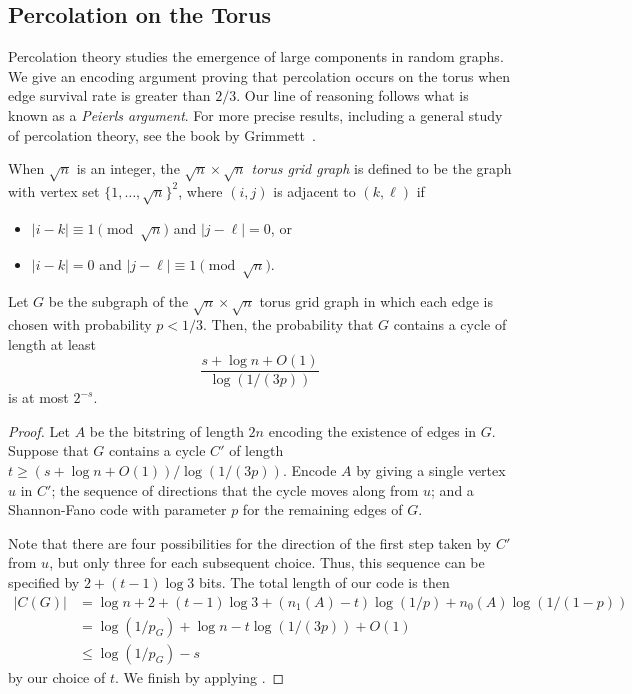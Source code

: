 \documentclass{patmorin}
\begin{document}
\subsection{Percolation on the Torus}

Percolation theory studies the emergence of large components in random
graphs. We give an encoding argument proving that percolation occurs
on the torus when edge survival rate is greater than $2/3$. Our line
of reasoning follows what is known as a \emph{Peierls argument}. For
more precise results, including a general study of percolation theory,
see the book by Grimmett~\cite{grimmett:percolation}.

  When $\sqrt{n}$ is an integer, the \emph{$\sqrt{n} \times \sqrt{n}$
    torus grid graph} is defined to be the graph with vertex set
  $\{1, \ldots, \sqrt{n}\}^2$, where $(i, j)$ is adjacent to
  $(k, \ell)$ if
  \begin{itemize}[topsep=0pt]
    \item $|i - k| \equiv 1 \pmod{\sqrt{n}}$ and $|j - \ell| = 0$, or
    \item $|i - k| = 0$ and $|j - \ell| \equiv 1 \pmod{\sqrt{n}}$.
  \end{itemize}

\begin{thm}
  Let $G$ be the subgraph of the $\sqrt{n} \times \sqrt{n}$ torus grid
  graph in which each edge is chosen with probability $p < 1/3$. Then,
  the probability that $G$ contains a cycle of length at least
  \[\frac{s + \log n + O(1)}{\log (1/(3p))}\]
  is at most $2^{-s}$.
\end{thm}
\begin{proof}
  Let $A$ be the bitstring of length $2n$ encoding the existence of
  edges in $G$. Suppose that $G$ contains a cycle $C'$ of length
  $t \geq (s + \log n + O(1))/\log (1/(3p))$. Encode $A$ by giving a
  single vertex $u$ in $C'$; the sequence of directions that the cycle
  moves along from $u$; and a Shannon-Fano code with parameter $p$ for
  the remaining edges of $G$.

  Note that there are four possibilities for the direction of the
  first step taken by $C'$ from $u$, but only three for each
  subsequent choice. Thus, this sequence can be specified by
  $2 + (t - 1) \log 3$ bits. The total length of our
  code is then
  \begin{align*}
    |C(G)| &= \log n + 2 + (t - 1) \log 3 + (n_1(A) - t) \log (1/p) +
             n_0(A) \log (1/(1 - p)) \\
           &= \log (1/p_G) + \log n - t \log (1/(3p)) + O(1) \\
           &\leq \log (1/p_G) - s
  \end{align*}
  by our choice of $t$. We finish by applying .
\end{proof}
\end{document}
